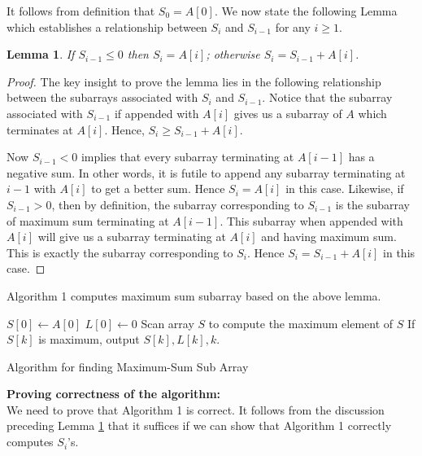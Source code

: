 \documentclass[11pt]{article}
\newtheorem{lemma}[theorem]{Lemma}
\begin{document}
It follows from definition that $S_0=A[0]$. We now state the following
Lemma which establishes a relationship between $S_i$ and $S_{i-1}$ for any
$i\ge 1$.
%
\begin{lemma}
If $S_{i-1}\leq 0 $ then $S_i=A[i]$; otherwise $S_i=S_{i-1}+A[i]$.
\label{Lemma:Si}
\end{lemma}
\vspace*{-.5cm}
\begin{proof}
The key insight to prove the lemma lies in the following relationship
between the subarrays associated with $S_i$ and $S_{i-1}$.
Notice that the subarray associated with $S_{i-1}$ if appended with $A[i]$
gives us a subarray of $A$ which terminates at $A[i]$.
Hence, $S_i\ge S_{i-1}+A[i]$.

Now $S_{i-1}<0$ implies that
every subarray terminating at $A[i-1]$ has a negative sum. In other words,
it is futile to append any subarray terminating at $i-1$ with $A[i]$ to
get a better sum. Hence $S_i=A[i]$ in this case.
Likewise, if $S_{i-1}>0$, then by definition, the subarray corresponding to
$S_{i-1}$ is the subarray of maximum sum terminating at $A[i-1]$. This
subarray when appended with $A[i]$ will give us a subarray terminating at
$A[i]$ and having maximum sum. This is exactly the subarray corresponding to
$S_i$. Hence $S_i=S_{i-1}+A[i]$ in this case.
\end{proof}
%
Algorithm 1 computes maximum sum subarray based on the above lemma.
\IncMargin{1em}
\begin{algorithm}[h]
\SetAlgoLined
{}
$ S[0]\leftarrow A[0]$\;
$ L[0]\leftarrow 0 $\;
Scan array $S$ to compute the maximum element of $S$\;
If $S[k]$ is maximum, output $S[k], L[k], k$.
\caption{Algorithm for finding Maximum-Sum Sub Array}
\end{algorithm}

%
\noindent
{\bf Proving correctness of the algorithm:}\\
We need to prove that Algorithm 1 is correct. It follows
from the discussion preceding Lemma \ref{Lemma:Si} that it suffices
if we can show that Algorithm 1 correctly computes $S_i$'s.
\end{document}
